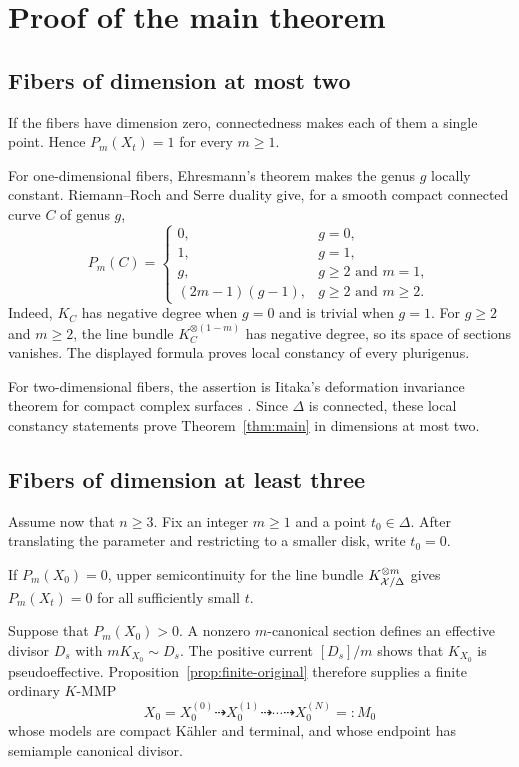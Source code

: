 \documentclass[11pt,a4paper]{article}
\theoremstyle{definition}\newtheorem{definition}[theorem]{Definition}
\theoremstyle{remark}\newtheorem*{remark}{Remark}
\begin{document}
\section{Proof of the main theorem}
\label{sec:main-proof}

\subsection{Fibers of dimension at most two}

If the fibers have dimension zero, connectedness makes each of them a
single point. Hence $P_m(X_t)=1$ for every $m\ge1$.

For one-dimensional fibers, Ehresmann's theorem makes the genus $g$
locally constant. Riemann--Roch and Serre duality give, for a smooth
compact connected curve $C$ of genus $g$,
\[
 P_m(C)=
 \begin{cases}
  0,&g=0,\\
  1,&g=1,\\
  g,&g\ge2\text{ and }m=1,\\
  (2m-1)(g-1),&g\ge2\text{ and }m\ge2.
 \end{cases}
\]
Indeed, $K_C$ has negative degree when $g=0$ and is trivial when $g=1$.
For $g\ge2$ and $m\ge2$, the line bundle $K_C^{\otimes(1-m)}$ has
negative degree, so its space of sections vanishes. The displayed
formula proves local constancy of every plurigenus.

For two-dimensional fibers, the assertion is Iitaka's deformation
invariance theorem for compact complex surfaces
\cite[Theorem~III, p.~247]{Iitaka1970}.
Since $\Delta$ is connected, these local constancy statements prove
Theorem~\ref{thm:main} in dimensions at most two.

\subsection{Fibers of dimension at least three}

Assume now that $n\ge3$. Fix an integer $m\ge1$ and a point
$t_0\in\Delta$. After translating the parameter and restricting to a
smaller disk, write $t_0=0$.

If $P_m(X_0)=0$, upper semicontinuity for the line bundle
$K_{\mathcal X/\Delta}^{\otimes m}$ gives $P_m(X_t)=0$ for all sufficiently
small $t$.

Suppose that $P_m(X_0)>0$. A nonzero $m$-canonical section defines an
effective divisor $D_s$ with $mK_{X_0}\sim D_s$.
The positive current $[D_s]/m$ shows that $K_{X_0}$ is pseudoeffective.
Proposition~\ref{prop:finite-original} therefore supplies a finite
ordinary $K$-MMP
\begin{equation}\label{eq:final-central-program}
 X_0=X_0^{(0)}\dashrightarrow X_0^{(1)}\dashrightarrow\cdots
 \dashrightarrow X_0^{(N)}=:M_0
\end{equation}
whose models are compact Kähler and terminal, and whose endpoint has
semiample canonical divisor.
\end{document}
